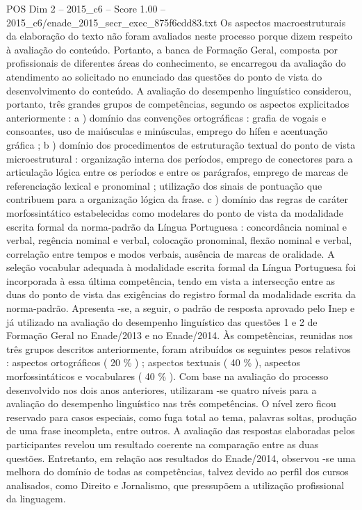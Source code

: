 \begin{textsample}{POS Dim 2 – 2015\_c6 – Score 1.00 – 2015\_c6/enade\_2015\_secr\_exec\_875f6cdd83.txt}
Os aspectos macroestruturais da elaboração do texto não foram avaliados neste processo porque dizem respeito à avaliação do conteúdo.
Portanto, a banca de Formação Geral, composta por profissionais de diferentes áreas do conhecimento, se encarregou da avaliação do atendimento ao solicitado no enunciado das questões do ponto de vista do desenvolvimento do conteúdo.
A avaliação do desempenho linguístico considerou, portanto, três grandes grupos de competências, segundo os aspectos explicitados anteriormente : a ) domínio das convenções ortográficas : grafia de vogais e consoantes, uso de maiúsculas e minúsculas, emprego do hífen e acentuação gráfica ; b ) domínio dos procedimentos de estruturação textual do ponto de vista microestrutural : organização interna dos períodos, emprego de conectores para a articulação lógica entre os períodos e entre os parágrafos, emprego de marcas de referenciação lexical e pronominal ; utilização dos sinais de pontuação que contribuem para a organização lógica da frase. c ) domínio das regras de caráter morfossintático estabelecidas como modelares do ponto de vista da modalidade escrita formal da norma-padrão da Língua Portuguesa : concordância nominal e verbal, regência nominal e verbal, colocação pronominal, flexão nominal e verbal, correlação entre tempos e modos verbais, ausência de marcas de oralidade.
A seleção vocabular adequada à modalidade escrita formal da Língua Portuguesa foi incorporada à essa última competência, tendo em vista a intersecção entre as duas do ponto de vista das exigências do registro formal da modalidade escrita da norma-padrão.
Apresenta -se, a seguir, o padrão de resposta aprovado pelo Inep e já utilizado na avaliação do desempenho linguístico das questões 1 e 2 de Formação Geral no Enade/2013 e no Enade/2014.
Às competências, reunidas nos três grupos descritos anteriormente, foram atribuídos os seguintes pesos relativos : aspectos ortográficos ( 20 \% ) ; aspectos textuais ( 40 \% ), aspectos morfossintáticos e vocabulares ( 40 \% ).
Com base na avaliação do processo desenvolvido nos dois anos anteriores, utilizaram -se quatro níveis para a avaliação do desempenho linguístico nas três competências.
O nível zero ficou reservado para casos especiais, como fuga total ao tema, palavras soltas, produção de uma frase incompleta, entre outros.
A avaliação das respostas elaboradas pelos participantes revelou um resultado coerente na comparação entre as duas questões.
Entretanto, em relação aos resultados do Enade/2014, observou -se uma melhora do domínio de todas as competências, talvez devido ao perfil dos cursos analisados, como Direito e Jornalismo, que pressupõem a utilização profissional da linguagem.

\end{textsample}
